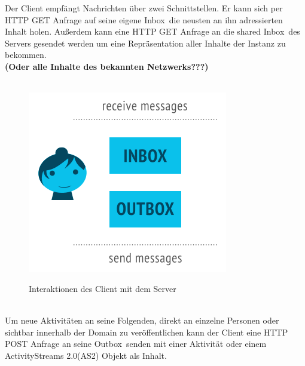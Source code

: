 	Der Client empfängt Nachrichten über zwei Schnittstellen. Er kann sich per HTTP GET Anfrage auf seine eigene \glqq Inbox\grqq~die neusten an ihn adressierten Inhalt holen. Außerdem kann eine HTTP GET Anfrage an die \glqq shared Inbox\grqq~des Servers gesendet werden um eine Repräsentation aller Inhalte der Instanz zu bekommen.\\ \textbf{(Oder alle Inhalte des bekannten Netzwerks???)}\\\\
	\begin{figure}[h]
		\centering
		\includegraphics[scale=0.6]{figures/inbox-outbox.png}
		\label{Client zu Server Interaktionen}
		\caption{Interaktionen des Client mit dem Server}
	\end{figure}\\
	Um neue Aktivitäten an seine Folgenden, direkt an einzelne Personen oder sichtbar innerhalb der Domain zu veröffentlichen kann der Client eine HTTP POST Anfrage an seine \glqq Outbox\grqq~senden mit einer Aktivität oder einem ActivityStreams 2.0(AS2) Objekt als Inhalt.


